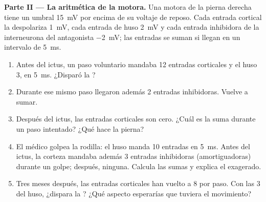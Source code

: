 \begin{problem}
\medskip
\noindent\textbf{Parte II --- La aritmética de la  motora.}
Una  motora de la pierna derecha tiene un umbral \qty{15}{mV}
por encima de su voltaje de reposo. Cada entrada cortical la
despolariza \qty{1}{mV}, cada entrada de huso \qty{2}{mV} y cada
entrada inhibidora de la interneurona del antagonista \qty{-2}{mV}; las
entradas se suman si llegan en un intervalo de \qty{5}{ms}.
\begin{enumerate}[resume]
  \item Antes del ictus, un paso voluntario mandaba 12 entradas
        corticales y el huso 3, en \qty{5}{ms}. ¿Disparó la ?
  \item Durante ese mismo paso llegaron además 2 entradas inhibidoras.
        Vuelve a sumar.
  \item Después del ictus, las entradas corticales son cero. ¿Cuál es
        la suma durante un paso intentado? ¿Qué hace la pierna?
  \item El médico golpea la rodilla: el huso manda 10 entradas en
        \qty{5}{ms}. Antes del ictus, la corteza mandaba además 3
        entradas inhibidoras (amortiguadoras) durante un golpe;
        después, ninguna. Calcula las sumas y explica el 
        exagerado.
  \item Tres meses después, las entradas corticales han vuelto a 8 por
        paso. Con las 3 del huso, ¿dispara la ? ¿Qué aspecto
        esperarías que tuviera el movimiento?
\end{enumerate}


\end{problem}
